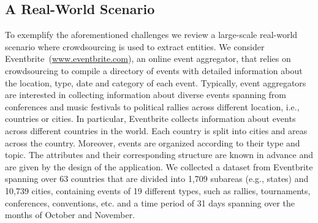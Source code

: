 \subsection{A Real-World Scenario}
\label{sec:challenges}
To exemplify the aforementioned challenges we review a large-scale real-world scenario where crowdsourcing is used to extract entities. We consider Eventbrite~(\url{www.eventbrite.com}), an online event aggregator, that relies on crowdsourcing to compile a directory of events with detailed information about the location, type, date and category of each event. \iftr Typically, event aggregators are interested in collecting information about diverse events spanning from conferences and music festivals to political rallies across different location, i.e., countries or cities. In particular, \fi Eventbrite collects information about events across different countries in the world. Each country is split into cities and areas across the country. Moreover, events are organized according to their type and topic. The attributes and their corresponding structure are known in advance and are given by the design of the application. \iftr We collected a dataset from Eventbrite spanning over 63 countries that are divided into 1,709 subareas (e.g., states) and 10,739 cities, containing events of 19 different types, such as rallies, tournaments, conferences, conventions, etc. and a time period of 31 days spanning over the months of October and November. \fi

